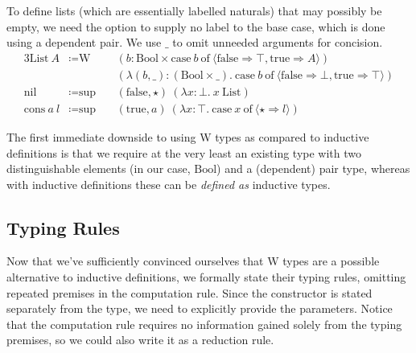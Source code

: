 \documentclass{report}
\newcommand{\List}{\const{List}}
\newcommand{\nil}{\const{nil}}
\newcommand{\cons}{\const{cons}}
\newcommand{\Bool}{\const{Bool}}
\newcommand{\true}{\const{true}}
\newcommand{\false}{\const{false}}
\newcommand{\W}{\const{W}}
\renewcommand{\sup}{\const{sup}}
\newcommand{\const}[1]{\text{#1}}
\newcommand{\case}{\const{case}}
\newcommand{\of}{\const{of}}
\begin{document}
To define lists (which are essentially labelled naturals) that may possibly be empty, we need the option to supply no label to the base case, which is done using a dependent pair. We use $\_$ to omit unneeded arguments for concision.
%
\begin{alignat*}{3}
    \List ~ A &\coloneqq \W ~ &&(b: \Bool \times \case ~ b ~ \of ~ \langle \false \Rightarrow \top, \true \Rightarrow A \rangle) \\
    &&&(\lambda (b, \_): (\Bool \times \_). ~ \case ~ b ~ \of ~ \langle \false \Rightarrow \bot, \true \Rightarrow \top \rangle) \\
    \nil &\coloneqq \sup ~ &&(\false, \star) ~ (\lambda x: \bot. ~ x ~ \List) \\
    \cons ~ a ~ l &\coloneqq \sup ~ &&(\true, a) ~ (\lambda x: \top. ~ \case ~ x ~ \of ~ \langle \star \Rightarrow l \rangle)
\end{alignat*}

The first immediate downside to using W types as compared to inductive definitions is that we require at the very least an existing type with two distinguishable elements (in our case, $\Bool$) and a (dependent) pair type, whereas with inductive definitions these can be \emph{defined as} inductive types.

\subsection{Typing Rules}

Now that we've sufficiently convinced ourselves that W types are a possible alternative to inductive definitions, we formally state their typing rules, omitting repeated premises in the computation rule. Since the constructor is stated separately from the type, we need to explicitly provide the parameters. Notice that the computation rule requires no information gained solely from the typing premises, so we could also write it as a reduction rule.
\end{document}
